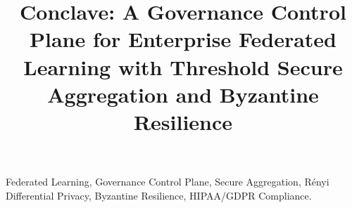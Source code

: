 \documentclass[conference]{IEEEtran}
\begin{document}
\title{Conclave: A Governance Control Plane for Enterprise Federated Learning with Threshold Secure Aggregation and Byzantine Resilience\\
}

\author{
\and
{}
}

\maketitle

\begin{abstract}

\end{abstract}

\begin{IEEEkeywords}
Federated Learning, Governance Control Plane, Secure Aggregation, Rényi Differential Privacy, Byzantine Resilience, HIPAA/GDPR Compliance.
\end{IEEEkeywords}










\end{document}
